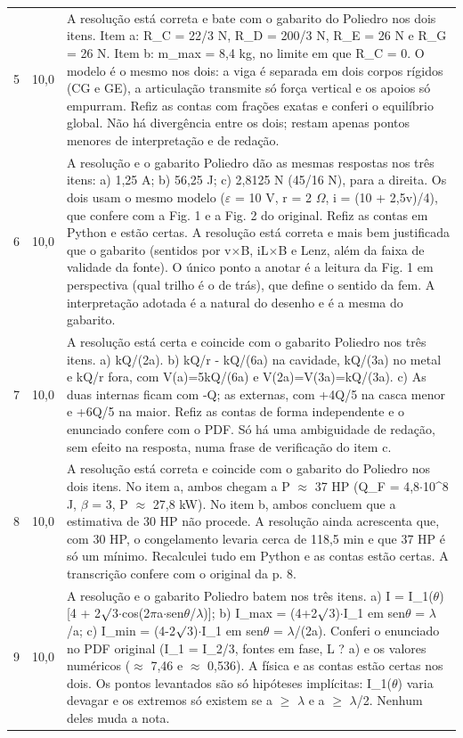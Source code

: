 \documentclass{article}%
\begin{document}
\begin{longtable}{@{}c c p{}@{}}
5 & 10,0 & A resolução está correta e bate com o gabarito do Poliedro nos dois itens. Item a: R\_C = 22/3 N, R\_D = 200/3 N, R\_E = 26 N e R\_G = 26 N. Item b: m\_max = 8,4 kg, no limite em que R\_C = 0. O modelo é o mesmo nos dois: a viga é separada em dois corpos rígidos (CG e GE), a articulação transmite só força vertical e os apoios só empurram. Refiz as contas com frações exatas e conferi o equilíbrio global. Não há divergência entre os dois; restam apenas pontos menores de interpretação e de redação. \\
6 & 10,0 & A resolução e o gabarito Poliedro dão as mesmas respostas nos três itens: a) 1,25 A; b) 56,25 J; c) 2,8125 N (45/16 N), para a direita. Os dois usam o mesmo modelo ($\varepsilon$ = 10 V, r = 2 $\Omega$, i = (10 + 2,5v)/4), que confere com a Fig. 1 e a Fig. 2 do original. Refiz as contas em Python e estão certas. A resolução está correta e mais bem justificada que o gabarito (sentidos por v$\times$B, iL$\times$B e Lenz, além da faixa de validade da fonte). O único ponto a anotar é a leitura da Fig. 1 em perspectiva (qual trilho é o de trás), que define o sentido da fem. A interpretação adotada é a natural do desenho e é a mesma do gabarito. \\
7 & 10,0 & A resolução está certa e coincide com o gabarito Poliedro nos três itens. a) kQ/(2a). b) kQ/r - kQ/(6a) na cavidade, kQ/(3a) no metal e kQ/r fora, com V(a)=5kQ/(6a) e V(2a)=V(3a)=kQ/(3a). c) As duas internas ficam com -Q; as externas, com +4Q/5 na casca menor e +6Q/5 na maior. Refiz as contas de forma independente e o enunciado confere com o PDF. Só há uma ambiguidade de redação, sem efeito na resposta, numa frase de verificação do item c. \\
8 & 10,0 & A resolução está correta e coincide com o gabarito do Poliedro nos dois itens. No item a, ambos chegam a P $\approx$ 37 HP (Q\_F = 4,8$\cdot$10\^{}8 J, $\beta$ = 3, P $\approx$ 27,8 kW). No item b, ambos concluem que a estimativa de 30 HP não procede. A resolução ainda acrescenta que, com 30 HP, o congelamento levaria cerca de 118,5 min e que 37 HP é só um mínimo. Recalculei tudo em Python e as contas estão certas. A transcrição confere com o original da p. 8. \\
9 & 10,0 & A resolução e o gabarito Poliedro batem nos três itens. a) I = I\_1($\theta$){[}4 + 2$\surd$3$\cdot$cos(2$\pi$a$\cdot$sen$\theta$/$\lambda$){]}; b) I\_max = (4+2$\surd$3)$\cdot$I\_1 em sen$\theta$ = $\lambda$/a; c) I\_min = (4-2$\surd$3)$\cdot$I\_1 em sen$\theta$ = $\lambda$/(2a). Conferi o enunciado no PDF original (I\_1 = I\_2/3, fontes em fase, L ? a) e os valores numéricos ($\approx$ 7,46 e $\approx$ 0,536). A física e as contas estão certas nos dois. Os pontos levantados são só hipóteses implícitas: I\_1($\theta$) varia devagar e os extremos só existem se a $\geq$ $\lambda$ e a $\geq$ $\lambda$/2. Nenhum deles muda a nota. \\

\end{longtable}
\end{document}
